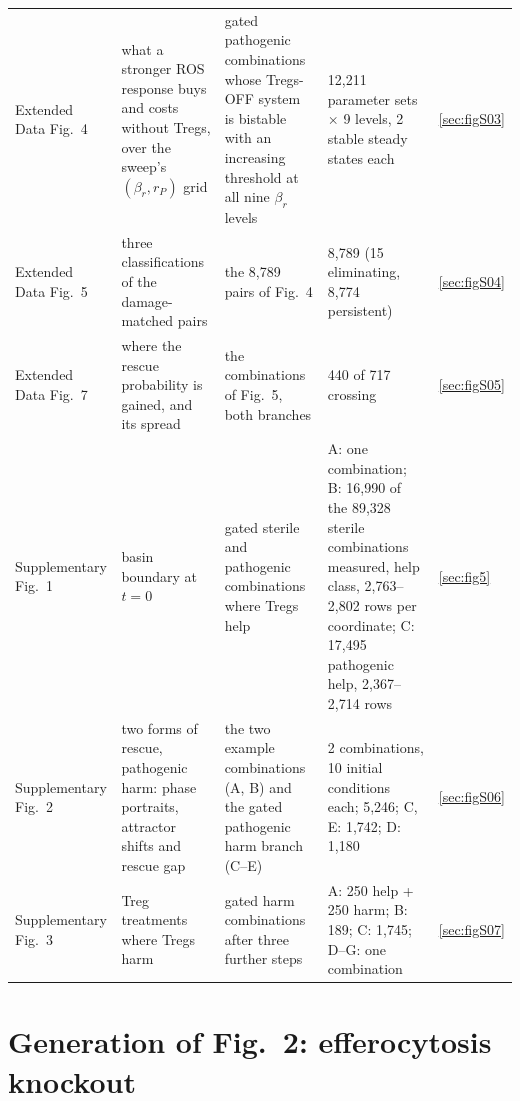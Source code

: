 \documentclass[11pt]{article}
\begin{document}
\begin{table}[H]
\begin{tabularx}{\linewidth}{@{}l L L L l@{}}
Extended Data Fig.~4 & what a stronger ROS response buys and costs without Tregs, over the sweep's $(\beta_r, r_P)$ grid & gated pathogenic combinations whose Tregs-OFF system is bistable with an increasing threshold at all nine $\beta_r$ levels & 12{,}211 parameter sets $\times$ 9 levels, 2 stable steady states each & \ref{sec:figS03}\\
Extended Data Fig.~5 & three classifications of the damage-matched pairs & the 8{,}789 pairs of Fig.~4 & 8{,}789 (15 eliminating, 8{,}774 persistent) & \ref{sec:figS04}\\
Extended Data Fig.~7 & where the rescue probability is gained, and its spread & the combinations of Fig.~5, both branches & 440 of 717 crossing & \ref{sec:figS05}\\
Supplementary Fig.~1 & basin boundary at $t=0$ & gated sterile and pathogenic combinations where Tregs help & A: one combination; B: 16{,}990 of the 89{,}328 sterile combinations measured, help class, 2{,}763--2{,}802 rows per coordinate; C: 17{,}495 pathogenic help, 2{,}367--2{,}714 rows & \ref{sec:fig5}\\
Supplementary Fig.~2 & two forms of rescue, pathogenic harm: phase portraits, attractor shifts and rescue gap & the two example combinations (A, B) and the gated pathogenic harm branch (C--E) & 2 combinations, 10 initial conditions each; 5{,}246; C, E: 1{,}742; D: 1{,}180 & \ref{sec:figS06}\\
Supplementary Fig.~3 & Treg treatments where Tregs harm & gated harm combinations after three further steps & A: 250 help + 250 harm; B: 189; C: 1{,}745; D--G: one combination & \ref{sec:figS07}\\
\bottomrule
\end{tabularx}
\end{table}

\section{Generation of Fig.~2: efferocytosis knockout}
\label{sec:fig1}

\end{document}
